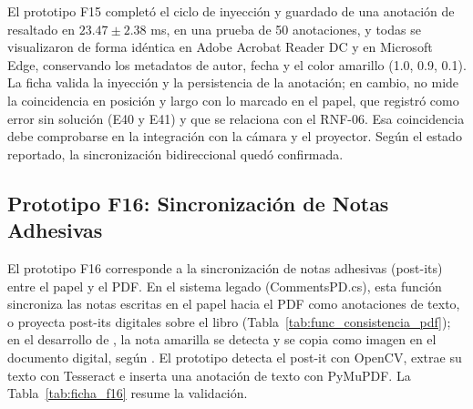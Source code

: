 El prototipo F15 completó el ciclo de inyección y guardado de una anotación de resaltado en $23.47 \pm 2.38$ ms, en una prueba de 50 anotaciones, y todas se visualizaron de forma idéntica en Adobe Acrobat Reader DC y en Microsoft Edge, conservando los metadatos de autor, fecha y el color amarillo (1.0, 0.9, 0.1). La ficha valida la inyección y la persistencia de la anotación; en cambio, no mide la coincidencia en posición y largo con lo marcado en el papel, que \cite{ibaceta2023evaluacion} registró como error sin solución (E40 y E41) y que se relaciona con el RNF-06. Esa coincidencia debe comprobarse en la integración con la cámara y el proyector. Según el estado reportado, la sincronización bidireccional quedó confirmada.
 
\subsection{Prototipo F16: Sincronización de Notas Adhesivas}
 
El prototipo F16 corresponde a la sincronización de notas adhesivas (post-its) entre el papel y el PDF. En el sistema legado (CommentsPD.cs), esta función sincroniza las notas escritas en el papel hacia el PDF como anotaciones de texto, o proyecta post-its digitales sobre el libro (Tabla~\ref{tab:func_consistencia_pdf}); en el desarrollo de \cite{pezoa2020implementacion}, la nota amarilla se detecta y se copia como imagen en el documento digital, según \cite{ibaceta2023evaluacion}. El prototipo detecta el post-it con OpenCV, extrae su texto con Tesseract e inserta una anotación de texto con PyMuPDF. La Tabla~\ref{tab:ficha_f16} resume la validación.
 
